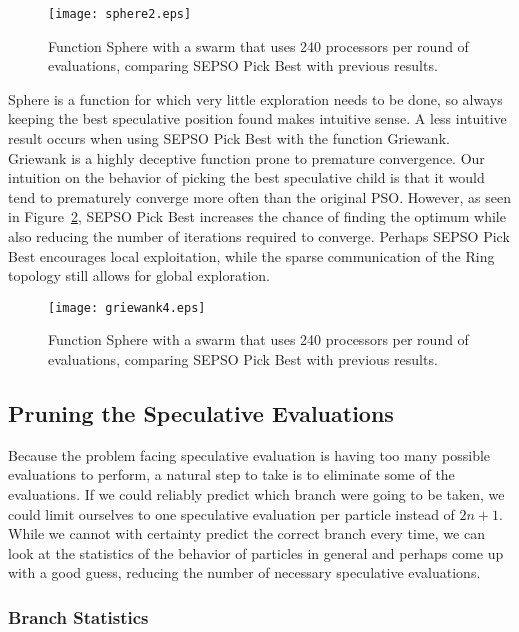 \documentclass[journal,letterpaper]{IEEEtran}
\newcommand{\fig}[1]{Figure~\ref{fig:#1}}
\begin{document}
\begin{figure}
  \centering
  \texttt{[image: sphere2.eps]}
  \caption{Function Sphere with a swarm that uses 240 processors per round of
  evaluations, comparing SEPSO Pick Best with previous results.}
  \label{fig:sphere-pickbest}
\end{figure}

Sphere is a function for which very little exploration needs to be done, so
always keeping the best speculative position found makes intuitive sense.  A
less intuitive result occurs when using SEPSO Pick Best with the function
Griewank.  Griewank is a highly deceptive function prone to premature
convergence.  Our intuition on the behavior of picking the best speculative
child is that it would tend to prematurely converge more often than the
original PSO.  However, as seen in \fig{griewank-pickbest}, SEPSO Pick Best
increases the chance of finding the optimum while also reducing the number of
iterations required to converge.  Perhaps SEPSO Pick Best encourages local
exploitation, while the sparse communication of the Ring topology still allows
for global exploration.

\begin{figure}
  \centering
  \texttt{[image: griewank4.eps]}
  \caption{Function Sphere with a swarm that uses 240 processors per round of
  evaluations, comparing SEPSO Pick Best with previous results.}
  \label{fig:griewank-pickbest}
\end{figure}

\subsection{Pruning the Speculative Evaluations}

Because the problem facing speculative evaluation is having too many possible
evaluations to perform, a natural step to take is to eliminate some of the
evaluations.  If we could reliably predict which branch were going to be taken,
we could limit ourselves to one speculative evaluation per particle instead of
$2n+1$.  While we cannot with certainty predict the correct branch every time,
we can look at the statistics of the behavior of particles in general and
perhaps come up with a good guess, reducing the number of necessary speculative
evaluations.

\subsubsection{Branch Statistics}
\end{document}
